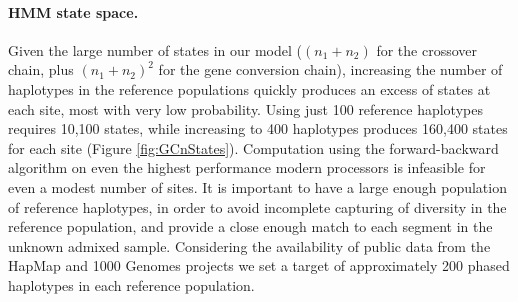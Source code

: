 \paragraph{HMM state space.}
Given the large number of states in our model ($(n_1+n_2)$ for the crossover chain, plus $(n_1+n_2)^2$ for the gene conversion chain), increasing the number of haplotypes in the reference populations quickly produces an excess of states at each site, most with very low probability.
Using just 100 reference haplotypes requires 10,100 states, while increasing to 400 haplotypes produces 160,400 states for each site (Figure \ref{fig:GCnStates}).
Computation using the forward-backward algorithm on even the highest performance modern processors is infeasible for even a modest number of sites.
It is important to have a large enough population of reference haplotypes, in order to avoid incomplete capturing of diversity in the reference population, and provide a close enough match to each segment in the unknown admixed sample.
Considering the availability of public data from the HapMap\cite{hapmap2007} and 1000 Genomes projects\cite{1000G2015} we set a target of approximately 200 phased haplotypes in each reference population.

